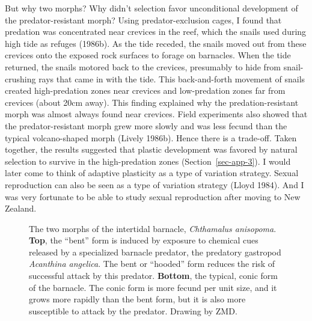 \documentclass[
  letterpaper,
]{book}
\begin{document}
But why two morphs? Why didn't selection favor unconditional development
of the predator-resistant morph? Using predator-exclusion cages, I found
that predation was concentrated near crevices in the reef, which the
snails used during high tide as refuges (1986b). As the tide receded,
the snails moved out from these crevices onto the exposed rock surfaces
to forage on barnacles. When the tide returned, the snails motored back
to the crevices, presumably to hide from snail-crushing rays that came
in with the tide. This back-and-forth movement of snails created
high-predation zones near crevices and low-predation zones far from
crevices (about 20cm away). This finding explained why the
predation-resistant morph was almost always found near crevices. Field
experiments also showed that the predator-resistant morph grew more
slowly and was less fecund than the typical volcano-shaped morph (Lively
1986b). Hence there is a trade-off. Taken together, the results
suggested that plastic development was favored by natural selection to
survive in the high-predation zones (Section~\ref{sec-app-3}). I would
later come to think of adaptive plasticity as a type of variation
strategy. Sexual reproduction can also be seen as a type of variation
strategy (Lloyd 1984). And I was very fortunate to be able to study
sexual reproduction after moving to New Zealand.

\begin{figure}


\caption[The two morphs of the intertidal barnacle, \emph{Chthamalus
anisopoma}]{\label{fig-3-2}The two morphs of the intertidal barnacle,
\emph{Chthamalus anisopoma}. \textbf{Top}, the ``bent'' form is induced
by exposure to chemical cues released by a specialized barnacle
predator, the predatory gastropod \emph{Acanthina angelica}. The bent or
``hooded'' form reduces the risk of successful attack by this predator.
\textbf{Bottom}, the typical, conic form of the barnacle. The conic form
is more fecund per unit size, and it grows more rapidly than the bent
form, but it is also more susceptible to attack by the predator. Drawing
by ZMD.}

\end{figure}%
\end{document}
